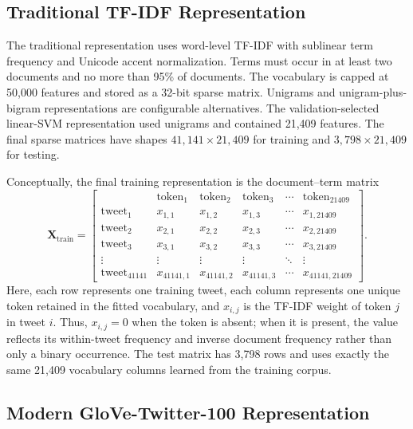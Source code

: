 \subsection{Traditional TF-IDF Representation}

The traditional representation uses word-level TF-IDF with sublinear term frequency and 
Unicode accent normalization. Terms must occur in at least two documents and no more than 95\% 
of documents. The vocabulary is capped at 50,000 features and stored as a 32-bit sparse matrix. 
Unigrams and unigram-plus-bigram representations are configurable alternatives. The 
validation-selected linear-SVM representation used unigrams and contained 21,409 features. 
The final sparse matrices have shapes $41{,}141 \times 21{,}409$ for training 
and $3{,}798 \times 21{,}409$ for testing.

Conceptually, the final training representation is the document--term matrix
\[
\mathbf{X}_{\mathrm{train}}=
\left[
\begin{array}{c|ccccc}
 & \text{token}_{1} & \text{token}_{2} & \text{token}_{3} & \cdots
 & \text{token}_{21409} \\
\hline
\text{tweet}_{1}      & x_{1,1}      & x_{1,2}      & x_{1,3}      & \cdots & x_{1,21409} \\
\text{tweet}_{2}      & x_{2,1}      & x_{2,2}      & x_{2,3}      & \cdots & x_{2,21409} \\
\text{tweet}_{3}      & x_{3,1}      & x_{3,2}      & x_{3,3}      & \cdots & x_{3,21409} \\
\vdots                & \vdots       & \vdots       & \vdots       & \ddots & \vdots \\
\text{tweet}_{41141} & x_{41141,1} & x_{41141,2} & x_{41141,3}
                       & \cdots & x_{41141,21409}
\end{array}
\right].
\]
Here, each row represents one training tweet, each column represents one unique
token retained in the fitted vocabulary, and $x_{i,j}$ is the TF-IDF weight of
token $j$ in tweet $i$. Thus, $x_{i,j}=0$ when the token is absent; when it is
present, the value reflects its within-tweet frequency and inverse document
frequency rather than only a binary occurrence. The test matrix has 3,798 rows
and uses exactly the same 21,409 vocabulary columns learned from the training
corpus.

\subsection{Modern GloVe-Twitter-100 Representation}

